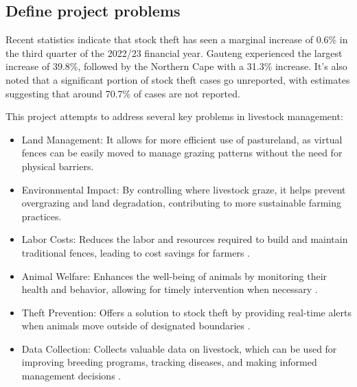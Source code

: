 \documentclass[conference]{main}
\begin{document}
\subsection{Define project problems}

Recent statistics indicate that stock theft has seen a marginal increase of
0.6\% in the third quarter of the 2022/23 financial year. Gauteng experienced
the largest increase of 39.8\%, followed by the Northern Cape with a 31.3\%
increase\cite{b1}. It’s also noted that a significant portion of stock theft cases go
unreported, with estimates suggesting that around 70.7\% of cases are not
reported\cite{b2}.



This project attempts to address several key problems in livestock management:

\begin{itemize}
    \item   Land Management: It allows for more efficient use of pastureland, as virtual fences can be easily moved to manage grazing patterns without the need for physical barriers\cite{b4}.
    \item   Environmental Impact: By controlling where livestock graze, it helps prevent overgrazing and land degradation, contributing to more sustainable farming practices\cite{b3}.
    \item   Labor Costs: Reduces the labor and resources required to build and maintain traditional fences, leading to cost savings for farmers \cite{b3}.
    \item   Animal Welfare: Enhances the well-being of animals by monitoring their health and behavior, allowing for timely intervention when necessary \cite{b4}.
    \item   Theft Prevention: Offers a solution to stock theft by providing real-time alerts when animals move outside of designated boundaries \cite{b3}.
\item   Data Collection: Collects valuable data on livestock, which can be used for improving breeding programs, tracking diseases, and making informed management decisions \cite{b4}.
\end{itemize}
\end{document}
